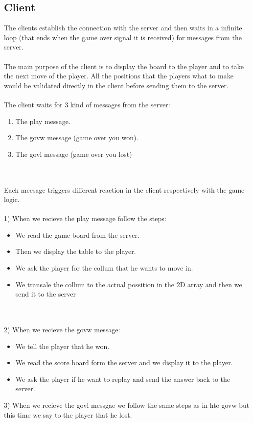 \documentclass{article}
\begin{document}
\subsection{Client}

The clients establish the connection with the server and then waits in a infinite loop (that ends when the game over signal it is received) for messages from the server.\\
\\
The main purpose of the client is to display the board to the player and to take the next move of the player. All the positions that the players what to make would be validated directly in the client before sending them to the server.\\
\\
The client waits for 3 kind of messages from the server:\\
\begin{enumerate}
    \item The play message.
    \item The govw message (game over you won).
    \item The govl message (game over you lost)
\end{enumerate}
\\
\\
Each meesage triggers different reaction in the client respectively with the game logic.\\ \\
1) When we recieve the play message follow the steps:\\
\begin{itemize}
    \item We read the game board from the server. 
    \item Then we display the table to the player.
    \item We ask the player for the collum that he wants to move in.
    \item We transale the collum to the actual possition in the 2D array and then we send it to the server
\end{itemize}
\\ \\ 
2) When we recieve the govw message:
\begin{itemize}
    \item We tell the player that he won.
    \item We read the score board form the server and we display it to the player.
    \item We ask the player if he want to replay and send the answer back to the server.
\end{itemize}
3) When we recieve the govl messgae we follow the same steps as in hte govw but this time we say to the player that he lost.
\end{document}
